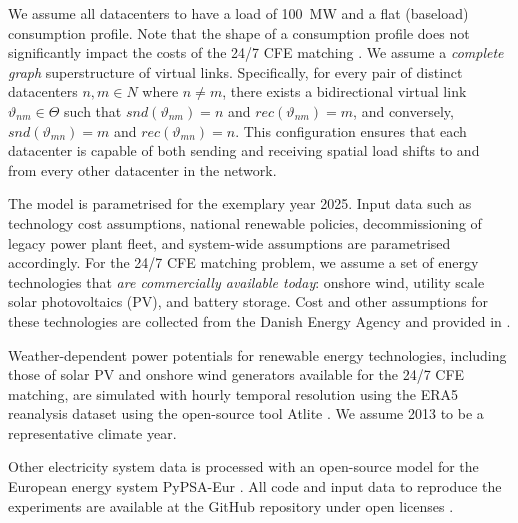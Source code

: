 We assume all datacenters to have a load of 100~MW and a flat (baseload) consumption profile. Note that the shape of a consumption profile does not significantly impact the costs of the 24/7 CFE matching \cite{riepin-zenodo-systemlevel247}. We assume a \textit{complete graph} superstructure of virtual links. Specifically, for every pair of distinct datacenters \(n, m \in N\) where \(n \neq m\), there exists a bidirectional virtual link \(\vartheta_{nm} \in \Theta\) such that \(snd(\vartheta_{nm}) = n\) and \(rec(\vartheta_{nm}) = m\), and conversely, \(snd(\vartheta_{mn}) = m\) and \(rec(\vartheta_{mn}) = n\). This configuration ensures that each datacenter is capable of both sending and receiving spatial load shifts to and from every other datacenter in the network.

The model is parametrised for the exemplary year 2025. Input data such as technology cost assumptions, national renewable policies, decommissioning of legacy power plant fleet, and system-wide assumptions are parametrised accordingly. For the 24/7 CFE matching problem, we assume a set of energy technologies that \textit{are commercially available today}: onshore wind, utility scale solar photovoltaics (\gls{PV}), and battery storage. Cost and other assumptions for these technologies are collected from the Danish Energy Agency \cite{DEA-technologydata} and provided in .

Weather-dependent power potentials for renewable energy technologies, including those of solar PV and onshore wind generators available for the 24/7 CFE matching, are simulated with hourly temporal resolution using the ERA5 reanalysis dataset \cite{hersbachERA5GlobalReanalysis2020} using the open-source tool Atlite \cite{atlite-github}. We assume 2013 to be a representative climate year.

Other electricity system data is processed with an open-source model for the European energy system PyPSA-Eur \cite{PyPSAEur-docs}. All code and input data to reproduce the experiments are available at the GitHub repository under open licenses \cite{github-spacetime}.


